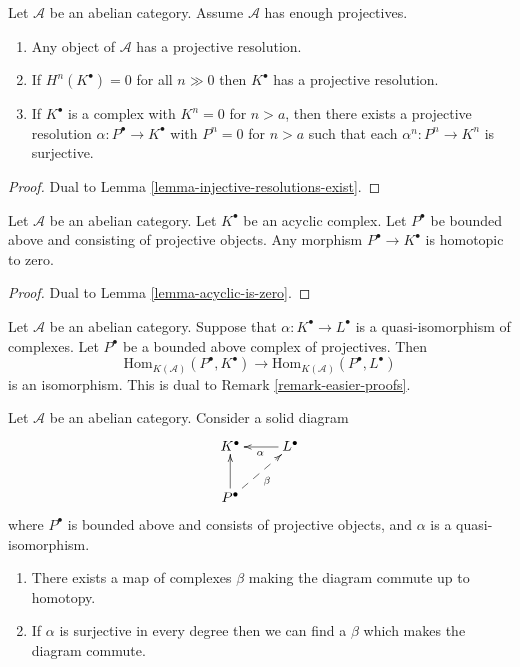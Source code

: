 \begin{lemma}
\label{lemma-projective-resolutions-exist}
Let $\mathcal{A}$ be an abelian category.
Assume $\mathcal{A}$ has enough projectives.
\begin{enumerate}
\item Any object of $\mathcal{A}$ has a projective resolution.
\item If $H^n(K^\bullet) = 0$ for all $n \gg 0$ then
$K^\bullet$ has a projective resolution.
\item If $K^\bullet$ is a complex with $K^n = 0$ for $n > a$, then
there exists a projective resolution $\alpha : P^\bullet \to K^\bullet$
with $P^n = 0$ for $n > a$ such that each $\alpha^n : P^n \to K^n$ is
surjective.
\end{enumerate}
\end{lemma}

\begin{proof}
Dual to
Lemma \ref{lemma-injective-resolutions-exist}.
\end{proof}

\begin{lemma}
\label{lemma-projective-into-acyclic-is-zero}
Let $\mathcal{A}$ be an abelian category.
Let $K^\bullet$ be an acyclic complex.
Let $P^\bullet$ be bounded above and consisting of projective objects.
Any morphism $P^\bullet \to K^\bullet$ is homotopic to zero.
\end{lemma}

\begin{proof}
Dual to
Lemma \ref{lemma-acyclic-is-zero}.
\end{proof}

\begin{remark}
\label{remark-easier-projective}
Let $\mathcal{A}$ be an abelian category.
Suppose that $\alpha : K^\bullet \to L^\bullet$ is a quasi-isomorphism
of complexes. Let $P^\bullet$ be a bounded above complex of projectives.
Then
$$
\text{Hom}_{K(\mathcal{A})}(P^\bullet, K^\bullet)
\longrightarrow
\text{Hom}_{K(\mathcal{A})}(P^\bullet, L^\bullet)
$$
is an isomorphism. This is dual to
Remark \ref{remark-easier-proofs}.
\end{remark}

\begin{lemma}
\label{lemma-morphisms-lift-projective}
Let $\mathcal{A}$ be an abelian category.
Consider a solid diagram
$$
\xymatrix{
K^\bullet & L^\bullet \ar[l]^\alpha \\
P^\bullet \ar[u] \ar@{-->}[ru]_\beta
}
$$
where $P^\bullet$ is bounded above and consists of projective
objects, and $\alpha$ is a quasi-isomorphism.
\begin{enumerate}
\item There exists a map of complexes $\beta$ making the diagram
commute up to homotopy.
\item If $\alpha$ is surjective in every degree
then we can find a $\beta$ which makes the diagram commute.
\end{enumerate}
\end{lemma}

